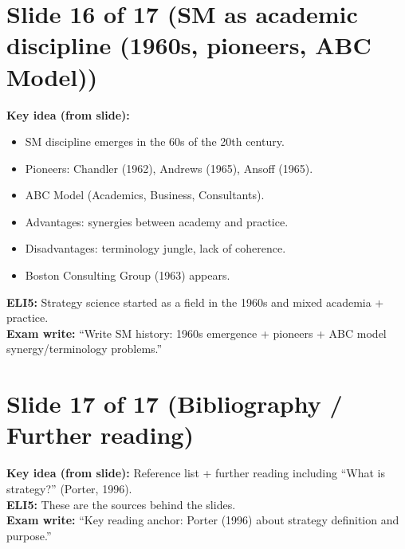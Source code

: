\documentclass[11pt,a4paper]{article}
\begin{document}
\section*{Slide 16 of 17 (SM as academic discipline (1960s, pioneers, ABC Model))}
\textbf{Key idea (from slide):}
\begin{itemize}
  \item SM discipline emerges in the 60s of the 20th century.
  \item Pioneers: Chandler (1962), Andrews (1965), Ansoff (1965).
  \item ABC Model (Academics, Business, Consultants).
  \item Advantages: synergies between academy and practice.
  \item Disadvantages: terminology jungle, lack of coherence.
  \item Boston Consulting Group (1963) appears.
\end{itemize}
\textbf{ELI5:} Strategy science started as a field in the 1960s and mixed academia + practice.\\
\textbf{Exam write:} ``Write SM history: 1960s emergence + pioneers + ABC model synergy/terminology problems.''

\section*{Slide 17 of 17 (Bibliography / Further reading)}
\textbf{Key idea (from slide):} Reference list + further reading including ``What is strategy?'' (Porter, 1996).\\
\textbf{ELI5:} These are the sources behind the slides.\\
\textbf{Exam write:} ``Key reading anchor: Porter (1996) about strategy definition and purpose.''
\end{document}
